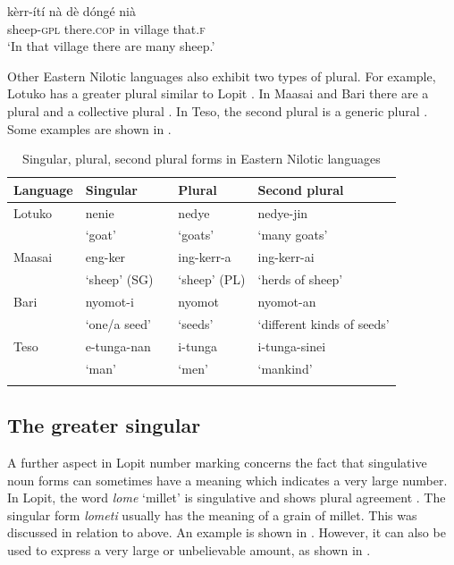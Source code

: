 \documentclass[output=paper]{langsci/langscibook}
\begin{document}
\ea\label{ex:moodie:7}
\gll k\`{e}rr-\'{i}t\'{i} n\`{a} d\`{e} d\'{o}ng\'{e} ni\`{a}\\
sheep-\textsc{gpl} there.\textsc{cop} in village that.\textsc{f} \\
\glt ‘In that village there are many sheep.’
\z

Other Eastern Nilotic languages also exhibit two types of plural. For example, Lotuko has a greater plural similar to Lopit \citep[57]{Muratori1938}. In Maasai and Bari there are a plural and a collective plural \citep[242]{Dimmendaal2000}. In Teso, the second plural is a generic plural \citep[4]{HildersLawrance1957}. Some examples are shown in . 

\begin{table}
\begin{tabularx}{\textwidth}{XXcXX}
\lsptoprule

 \textbf{Language} & \textbf{Singular} &  & \textbf{Plural} & \textbf{Second plural}\\ \midrule
Lotuko &  nenie &  &  nedye &  nedye-jin\\
& ‘goat’ &  & ‘goats’ & ‘many goats’\\
Maasai &  eng-ker &  &  ing-kerr-a &  ing-kerr-ai\\
& ‘sheep’ (SG) &  & ‘sheep’ (PL) & ‘herds of sheep’\\
Bari &  nyomot-i &  &  nyomot &  nyomot-an\\
& ‘one/a seed’ &  & ‘seeds’ & ‘different kinds of seeds’\\
Teso &  e-tunga-nan &  &  i-tunga &  i-tunga-sinei\\
& ‘man’ &  & ‘men’ & ‘mankind’\\
\lspbottomrule
\end{tabularx}
\caption{Singular, plural, second plural forms in Eastern Nilotic languages}
\label{tab:moodie:18}
\end{table}

\subsection{The greater singular}\label{sec:moodie:5.2}

A further aspect in Lopit number marking concerns the fact that singulative noun forms can sometimes have a meaning which indicates a very large number. In Lopit, the word \textit{lome} ‘millet’ is singulative and shows plural agreement . The singular form \textit{lometi} usually has the meaning of a grain of millet. This was discussed in relation to  above. An example is shown in . However, it can also be used to express a very large or unbelievable amount, as shown in .
\end{document}
